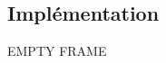 \documentclass{beamer}%
\begin{document}
\begin{frame}
\begin{columns}
					\column{2in}
						\begin{figure}
							\centering
							\\
						\end{figure}
				\end{columns}
			\end{frame}		
		
		\subsection{Implémentation}
			\begin{frame}
				EMPTY FRAME
			\end{frame}
			
\end{document}
